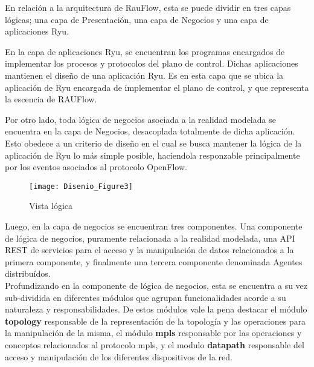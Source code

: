 En relaci\'on a la arquitectura de RauFlow, esta se puede dividir en tres capas l\'ogicas; una capa de Presentaci\'on, una capa de Negocios y una capa de aplicaciones Ryu.



En la capa de aplicaciones Ryu, se encuentran los programas encargados de implementar los procesos y protocolos del plano de control. Dichas aplicaciones mantienen el dise\~no de una aplicaci\'on Ryu. Es en esta capa que se ubica la aplicaci\'on de Ryu encargada de implementar el plano de control, y que representa la escencia de RAUFlow.

Por otro lado, toda l\'ogica de negocios asociada a la realidad modelada se encuentra en la capa de Negocios, desacoplada totalmente de dicha aplicaci\'on. Esto obedece a un criterio de dise\~no en el cual se busca mantener la l\'ogica de la aplicaci\'on de Ryu lo m\'as simple posible, haciendola responzable principalmente por los eventos asociados al protocolo OpenFlow.\\ 

\begin{figure}[ht!] 
\centering    
\texttt{[image: Disenio\_Figure3]}
\caption[Vista l\'ogica]{Vista l\'ogica}
\label{fig:VistaComponentes2}
\end{figure}

Luego, en la capa de negocios se encuentran tres componentes. Una componente de l\'ogica de negocios, puramente relacionada a la realidad modelada, una API REST de servicios para el acceso y la manipulaci\'on de datos relacionados a la primera componente, y finalmente una tercera componente denominada Agentes distribu\'idos.\\

Profundizando en la componente de l\'ogica de negocios, esta se encuentra a su vez sub-dividida en diferentes m\'odulos que agrupan funcionalidades acorde a su naturaleza y responsabilidades. De estos m\'odulos vale la pena destacar el m\'odulo \textbf{topology} responsable de la representaci\'on de la topolog\'ia y las operaciones para la manipulaci\'on de la misma, el m\'odulo \textbf{mpls} responsable por las operaciones y conceptos relacionados al protocolo mpls, y el modulo \textbf{datapath} responsable del acceso y manipulaci\'on de los diferentes dispositivos de la red.\\ 

